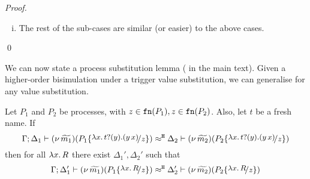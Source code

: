 \begin{proof}
\begin{enumerate}
\begin{enumerate}[i.]


					\item	The rest of the sub-cases are similar (or easier) to the above cases.

%					
				\end{enumerate}
	\end{enumerate}
	\qed
\end{proof}




We can now state a process substitution lemma
( in the main text).
Given a higher-order bisimulation under a trigger value
substitution, we can generalise for any value substitution.


\begin{lemma}
	\label{lem:process_subst}
	Let $P_1$ and $P_2$ be processes, with $z \in \mathtt{fn}(P_1), z \in \mathtt{fn}(P_2)$.
	Also, let $t$ be a fresh name.
	If
	\[
		\horel{\Gamma}{\Delta_1}{\newsp{\widetilde{m_1}}{P_1 \subst{\trvalx{t}}{z} }}
		{\hwb}
		{\Delta_2}{\newsp{\widetilde{m_2}}{P_2 \subst{\trvalx{t}}{z} }}
	\]
	then for all $\lambda x.\,R$ there exist  $\Delta_1', \Delta_2'$ such that
	\[
		\horel{\Gamma}{\Delta_1'}{\newsp{\widetilde{m_1}}{P_1 \subst{{\abs{x}{R}}}{z} }}
		{\hwb}
		{\Delta_2'}{\newsp{\widetilde{m_2}}{P_2 \subst{{\abs{x}{R}}}{z} }}
	\]
\end{lemma}


